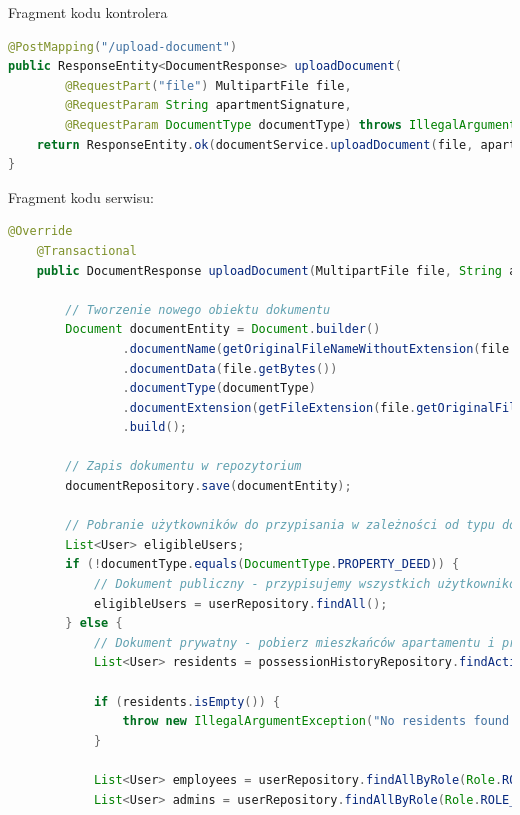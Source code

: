Fragment kodu kontrolera
\begin{lstlisting}[language=Java, caption=Fragment klasy \texttt{DocumentController}]
@PostMapping("/upload-document")
public ResponseEntity<DocumentResponse> uploadDocument(
        @RequestPart("file") MultipartFile file,
        @RequestParam String apartmentSignature,
        @RequestParam DocumentType documentType) throws IllegalArgumentException, IOException {
    return ResponseEntity.ok(documentService.uploadDocument(file, apartmentSignature, documentType));
}
\end{lstlisting}

Fragment kodu serwisu:
\begin{lstlisting}[language=Java, caption=Metoda dodawania dokumentu w klasie \texttt{DocumentServiceImp}]
		@Override
    @Transactional
    public DocumentResponse uploadDocument(MultipartFile file, String apartmentSignature, DocumentType documentType) throws IllegalArgumentException, IOException {

        // Tworzenie nowego obiektu dokumentu
        Document documentEntity = Document.builder()
                .documentName(getOriginalFileNameWithoutExtension(file.getOriginalFilename()))
                .documentData(file.getBytes())
                .documentType(documentType)
                .documentExtension(getFileExtension(file.getOriginalFilename()))
                .build();

        // Zapis dokumentu w repozytorium
        documentRepository.save(documentEntity);

        // Pobranie użytkowników do przypisania w zależności od typu dokumentu
        List<User> eligibleUsers;
        if (!documentType.equals(DocumentType.PROPERTY_DEED)) {
            // Dokument publiczny - przypisujemy wszystkich użytkowników
            eligibleUsers = userRepository.findAll();
        } else {
            // Dokument prywatny - pobierz mieszkańców apartamentu i pracowników oraz adminów
            List<User> residents = possessionHistoryRepository.findActiveResidentsByApartment(apartmentSignature);

            if (residents.isEmpty()) {
                throw new IllegalArgumentException("No residents found in apartment with signature: " + apartmentSignature);
            }

            List<User> employees = userRepository.findAllByRole(Role.ROLE_EMPLOYEE);
            List<User> admins = userRepository.findAllByRole(Role.ROLE_ADMIN);


\end{lstlisting}

